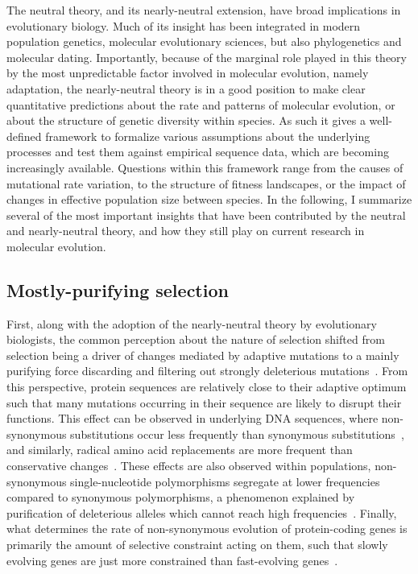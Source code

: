 The neutral theory, and its nearly-neutral extension, have broad implications in evolutionary biology.
Much of its insight has been integrated in modern population genetics, molecular evolutionary sciences, but also phylogenetics and molecular dating.
Importantly, because of the marginal role played in this theory by the most unpredictable factor involved in molecular evolution, namely adaptation, the nearly-neutral theory is in a good position to make clear quantitative predictions about the rate and patterns of molecular evolution, or about the structure of genetic diversity within species.
As such it gives a well-defined framework to formalize various assumptions about the underlying processes and test them against empirical sequence data, which are becoming increasingly available.
Questions within this framework range from the causes of mutational rate variation, to the structure of fitness landscapes, or the impact of changes in effective population size between species.
In the following, I summarize several of the most important insights that have been contributed by the neutral and nearly-neutral theory, and how they still play on current research in molecular evolution.

\subsection{Mostly-purifying selection}
\label{subsec:mostly-purifying-selection}

First, along with the adoption of the nearly-neutral theory by evolutionary biologists, the common perception about the nature of selection shifted from selection being a driver of changes mediated by adaptive mutations to a mainly purifying force discarding and filtering out strongly deleterious mutations~\citep{Lynch2007}.
From this perspective, protein sequences are relatively close to their adaptive optimum such that many mutations occurring in their sequence are likely to disrupt their functions.
This effect can be observed in underlying \acrshort{DNA} sequences, where non-synonymous substitutions occur less frequently than synonymous substitutions~\citep{King1969}, and similarly, radical amino acid replacements are more frequent than conservative changes~\citep{kimura1983neutral}.
These effects are also observed within populations, non-synonymous single-nucleotide polymorphisms segregate at lower frequencies compared to synonymous polymorphisms, a phenomenon explained by purification of deleterious alleles which cannot reach high frequencies~\citep{Akashi1999, Cargill1999, Hughes2005}.
Finally, what determines the rate of non-synonymous evolution of protein-coding genes is primarily the amount of selective constraint acting on them, such that slowly evolving genes are just more constrained than fast-evolving genes~\citet{kimura1983neutral}.

